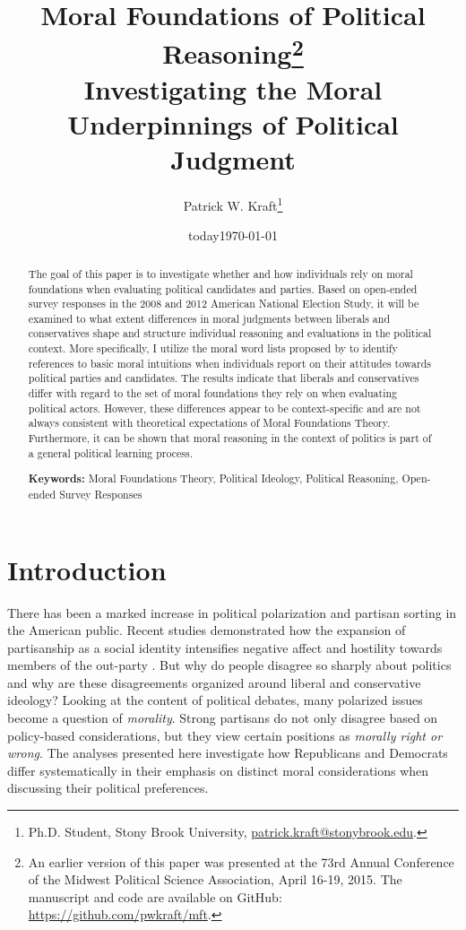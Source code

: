 \documentclass[12pt]{article}
\author{Patrick W. Kraft\footnote{Ph.D. Student, Stony Brook University, \href{mailto:patrick.kraft@stonybrook.edu}{patrick.kraft@stonybrook.edu}.
}}
\date{today}
\title{Moral Foundations of Political Reasoning\footnote{An earlier version of this paper was presented at the 73rd Annual Conference of the Midwest Political Science Association, April 16-19, 2015. The manuscript and code are available on GitHub: \url{https://github.com/pwkraft/mft}.}\\
\large{Investigating the Moral Underpinnings of Political Judgment}}
\date{\today}
\begin{document}
\maketitle

\begin{abstract}%
The goal of this paper is to investigate whether and how individuals rely on moral foundations when evaluating political candidates and parties. Based on open-ended survey responses in the 2008 and 2012 American National Election Study, it will be examined to what extent differences in moral judgments between liberals and conservatives shape and structure individual reasoning and evaluations in the political context. More specifically, I utilize the moral word lists proposed by \citet{graham2009liberals} to identify references to basic moral intuitions when individuals report on their attitudes towards political parties and candidates. The results indicate that liberals and conservatives differ with regard to the set of moral foundations they rely on when evaluating political actors. However, these differences appear to be context-specific and are not always consistent with theoretical expectations of Moral Foundations Theory. Furthermore, it can be shown that moral reasoning in the context of politics is part of a general political learning process.

\vspace{\baselineskip}
\noindent \textbf{Keywords:} Moral Foundations Theory, Political Ideology, Political Reasoning, Open-ended Survey Responses
\end{abstract}

\newpage
\singlespacing

\section{Introduction}

There has been a marked increase in political polarization and partisan sorting in the American public. Recent studies demonstrated how the expansion of partisanship as a social identity intensifies negative affect and hostility towards members of the out-party \citep{iyengar2014fear,mason2014disrespectfully}. But why do people disagree so sharply about politics and why are these disagreements organized around liberal and conservative ideology? Looking at the content of political debates, many polarized issues become a question of \textit{morality}. Strong partisans do not only disagree based on policy-based considerations, but they view certain positions as \textit{morally right or wrong}. The analyses presented here investigate how Republicans and Democrats differ systematically in their emphasis on distinct moral considerations when discussing their political preferences.
\end{document}
